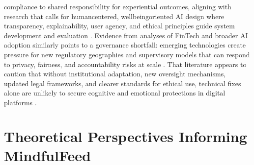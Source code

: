 \documentclass{article}
\begin{document}
compliance to shared responsibility for experiential outcomes, aligning with research that calls for human\-centered, well\-being\-oriented AI design where transparency, explainability, user agency, and ethical principles guide system development and evaluation \parencites[7]{9300898}[17]{2404919}. Evidence from analyses of FinTech and broader AI adoption similarly points to a governance shortfall: emerging technologies create pressure for new regulatory geographies and supervisory models that can respond to privacy, fairness, and accountability risks at scale \parencites[11]{5353824}. That literature appears to caution that without institutional adaptation, new oversight mechanisms, updated legal frameworks, and clearer standards for ethical use, technical fixes alone are unlikely to secure cognitive and emotional protections in digital platforms \parencites[11]{5353824}.

\section{Theoretical Perspectives Informing MindfulFeed}
\end{document}
